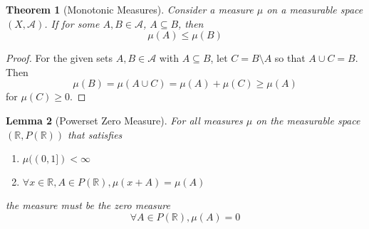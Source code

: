 \documentclass{article}
\newtheorem{theorem}{Theorem}[section]
\newtheorem{lemma}[theorem]{Lemma}
\begin{document}
\begin{theorem}[Monotonic Measures]
    Consider a measure $\mu$ on a measurable space $(X, \mathcal A)$. If for some $A, B \in \mathcal A$, $A \subseteq B$, then
    \[
        \mu(A) \leq \mu(B)
    \]
\end{theorem}
\begin{proof}
    For the given sets $A, B \in \mathcal A$ with $A \subseteq B$, let $C = B \setminus A$ so that $A \cup C = B$. Then
    \[
        \mu(B) = \mu(A \cup C) = \mu(A) + \mu(C) \geq \mu(A)
    \]
    for $\mu(C) \geq 0$.
\end{proof}

\begin{lemma}[Powerset Zero Measure]
    For all measures $\mu$ on the measurable space $(\mathbb{R}, P(\mathbb{R}))$ that satisfies
    \begin{enumerate}
        \item $\mu((0,1]) < \infty$
        \item $\forall x \in \mathbb{R}, A \in P(\mathbb{R}), \mu(x + A) = \mu(A)$
    \end{enumerate}
    the measure must be the zero measure
    \[
        \forall A \in P(\mathbb{R}), \mu(A) = 0
    \]
\end{lemma}
\end{document}

